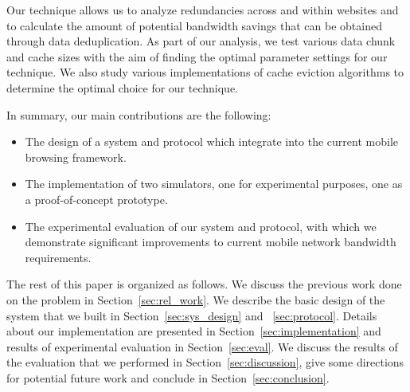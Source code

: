 
Our technique allows us to analyze redundancies across and within websites and to calculate the amount of potential bandwidth savings that can be obtained through data deduplication. As part of our analysis, we test various data chunk and cache sizes with the aim of finding the optimal parameter settings for our technique. We also study various implementations of cache eviction algorithms to determine the optimal choice for our technique. 


In summary, our main contributions are the following:
\begin{itemize}
\item The design of a system and protocol which integrate into the current mobile browsing framework.
\item The implementation of two simulators, one for experimental purposes, one as a proof-of-concept prototype.
\item The experimental evaluation of our system and protocol, with which we demonstrate significant improvements to current mobile network bandwidth requirements.
\end{itemize}

The rest of this paper is organized as follows. We discuss the previous work done on the problem in Section~\ref{sec:rel_work}. We describe the basic design of the 
system that we built in Section~\ref{sec:sys_design} and ~\ref{sec:protocol}. Details about our implementation are presented in Section~\ref{sec:implementation} 
and results of experimental evaluation in Section~\ref{sec:eval}. We discuss the results of the evaluation that we performed in Section~\ref{sec:discussion}, give 
some directions for potential future work and conclude in Section~\ref{sec:conclusion}.
